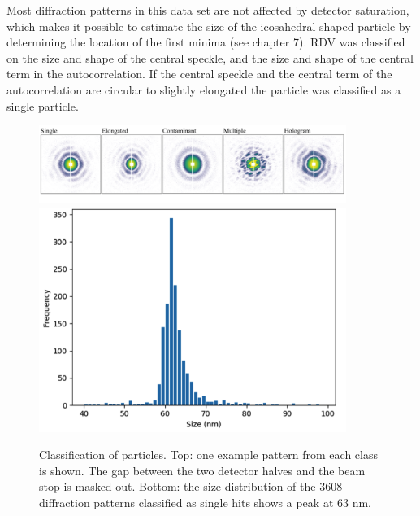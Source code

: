 Most diffraction patterns in this data set are not affected by detector saturation, which makes it possible to estimate the size of the icosahedral-shaped particle by determining the location of the first minima (see chapter 7).
RDV was classified on the size and shape of the central speckle, and the size and shape of the central term in the autocorrelation. If the central speckle and the central term of the autocorrelation are circular to slightly elongated the particle was classified as a single particle.  

\begin{figure}[h]
\centering
\includegraphics[width=100mm]{Chapter_09_Results_RDV_classes.png}
\includegraphics[width=100mm]{Chapter_09_Results_RDV_size_distribution.png}\label{fig:Classes}
\caption{Classification of particles. Top: one example pattern from each class is shown. The gap between the two detector halves and the beam stop is masked out. Bottom: the size distribution of the 3608 diffraction patterns classified as single hits shows a peak at 63 nm.}
\end{figure}